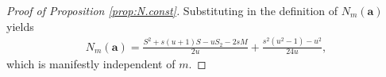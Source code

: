 \documentclass[10pt,a4paper]{amsart}
\begin{document}
\begin{proof}[Proof of Proposition \ref{prop:N.const}]
Substituting in the definition of $N_m(\mathbf{a})$ yields
\begin{align*}
N_m(\mathbf{a}) = \frac{S^2 + s(u+1)S - uS_2 - 2sM}{2 u} + \frac{s^2 \left(u^2-1\right)-u^2}{24 u},
\end{align*}
which is manifestly independent of $m$.
\end{proof}
\end{document}
